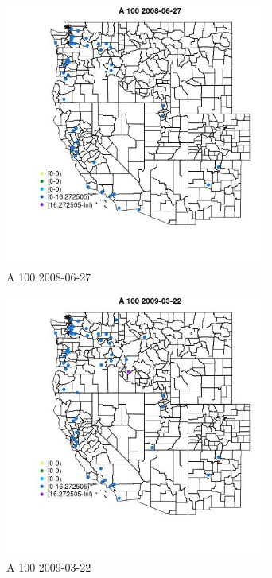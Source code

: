 \begin{figure} 
\centering  
\includegraphics[width=0.77\textwidth]{Code_Outputs/Report_ML_input_PM25_Step4_part_e_de_duplicated_aves_MapObsA_1002008-06-27.jpg} 
\caption{\label{fig:Report_ML_input_PM25_Step4_part_e_de_duplicated_avesMapObsA_1002008-06-27}A 100 2008-06-27} 
\end{figure} 
 

\clearpage 

\begin{figure} 
\centering  
\includegraphics[width=0.77\textwidth]{Code_Outputs/Report_ML_input_PM25_Step4_part_e_de_duplicated_aves_MapObsA_1002009-03-22.jpg} 
\caption{\label{fig:Report_ML_input_PM25_Step4_part_e_de_duplicated_avesMapObsA_1002009-03-22}A 100 2009-03-22} 
\end{figure} 
 

